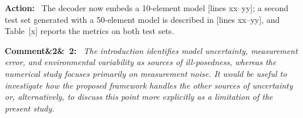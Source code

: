 \documentclass[11pt]{article}
\newenvironment{rcomment}[1]{\par\bigskip\noindent\textbf{Comment\ifx&#1&\else\ #1\fi:}\ \itshape}{\par}
\newenvironment{action}{\par\smallskip\noindent\color{resp}\textbf{Action:}\ }{\par}
\newcommand{\tbd}[1]{\textcolor{note}{\textsf{[#1]}}}
\newcommand{\lines}[1]{\tbd{lines #1}}
\begin{document}
\begin{action}
The decoder now embeds a 10-element model \lines{xx--yy}; a second test set generated with a 50-element model is
described in \lines{xx--yy}, and Table~\tbd{x} reports the metrics on both test sets.
\end{action}

\begin{rcomment}{2}
The introduction identifies model uncertainty, measurement error, and environmental variability as sources of
ill-posedness, whereas the numerical study focuses primarily on measurement noise. It would be useful to investigate how
the proposed framework handles the other sources of uncertainty or, alternatively, to discuss this point more explicitly
as a limitation of the present study.
\end{rcomment}
\end{document}
